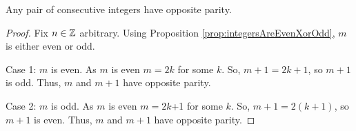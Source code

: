 \guard




\begin{prop}
\label{prop:consecutiveIntegersOppositeParity}
  Any pair of consecutive integers have opposite parity.
\end{prop}
\begin{proof}
  Fix $n\in\mathbb{Z}$ arbitrary.
  Using Proposition \ref{prop:integersAreEvenXorOdd}, $m$ is either even or odd.

  Case 1: $m$ is even.
  As $m$ is even $m=2k$ for some $k$.
  So, $m+1 = 2k+1$, so $m+1$ is odd.
  Thus, $m$ and $m+1$ have opposite parity.


  Case 2: $m$ is odd.
  As $m$ is even $m=2k$+1 for some $k$.
  So, $m+1 = 2(k+1)$, so $m+1$ is even.
  Thus, $m$ and $m+1$ have opposite parity.
\end{proof}

